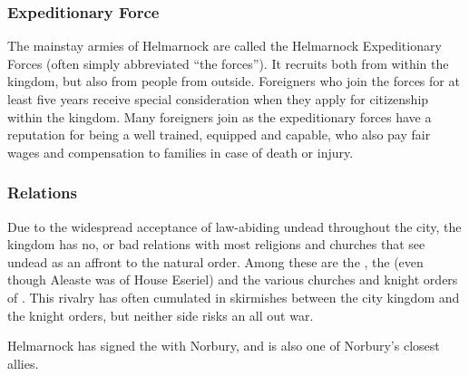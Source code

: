 \subsubsection{Expeditionary Force}
\label{sec:Expeditionary Force}

The mainstay armies of Helmarnock are called the Helmarnock Expeditionary
Forces (often simply abbreviated ``the forces''). It recruits both from within
the kingdom, but also from people from outside. Foreigners who join the forces
for at least five years receive special consideration when they apply for
citizenship within the kingdom. Many foreigners join as the expeditionary
forces have a reputation for being a well trained, equipped and capable, who
also pay fair wages and compensation to families in case of death or injury.

\subsubsection{Relations}

Due to the widespread acceptance of law-abiding undead throughout the city,
the kingdom has no, or bad relations with most religions and churches that see
undead as an affront to the natural order. Among these are the
, the  (even
though Aleaste was of House Eseriel) and the various churches and knight
orders of . This rivalry has often cumulated in skirmishes
between the city kingdom and the knight orders, but neither side risks an all
out war.

Helmarnock has signed the  with Norbury, and is also
one of Norbury's closest allies.
